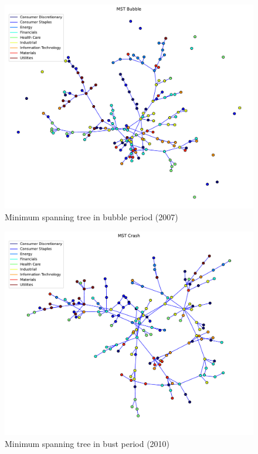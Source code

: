 \documentclass[sigchi]{acmart}
\begin{document}
\begin{figure}[H]
	\centering
	\includegraphics[width=\linewidth]{MST Bubble.pdf}
	\caption{Minimum spanning tree in bubble period (2007)}
\end{figure}
\begin{figure}[H]
	\centering
	\includegraphics[width=\linewidth]{MST Crash.pdf}
	\caption{Minimum spanning tree in bust period (2010)}
\end{figure}
\end{document}
